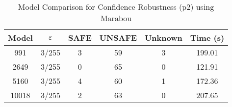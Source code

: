 \begin{table}[htbp]
\centering
\caption{Model Comparison for Confidence Robustness (p2) using Marabou}
\label{tab:p2_marabou_model_comparison}
\begin{tabular}{|c|c|c|c|c|c|}
\hline
Model & $\varepsilon$ & SAFE & UNSAFE & Unknown & Time (s) \\ \hline
991 & 3/255 & 3 & 59 & 3 & 199.01 \\ \hline
2649 & 3/255 & 0 & 65 & 0 & 121.91 \\ \hline
5160 & 3/255 & 4 & 60 & 1 & 172.36 \\ \hline
10018 & 3/255 & 2 & 63 & 0 & 207.65 \\ \hline
\end{tabular}
\end{table}
